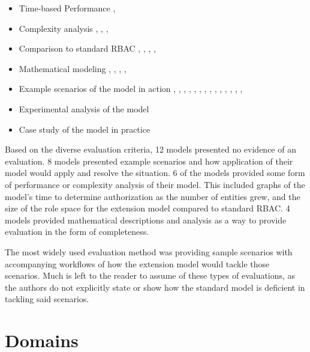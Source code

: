 \begin{itemize}
\setlength{\itemsep}{0.25pt}
\item Time-based Performance \cite{ni2010privacy}, \cite{aich09:role}
\item Complexity analysis \cite{bao08:role}, \cite{zhang06:collaborative}, \cite{chen08:spatio-temporal}, \cite{aich09:role}
\item Comparison to standard RBAC \cite{bao08:role}, \cite{zou2009crbac}, \cite{zhang06:collaborative}, \cite{zhao2008flexible}, \cite{ray07:spatio}
\item Mathematical modeling \cite{damian2007geo}, \cite{hansen2003spatial}, \cite{aich07:STARBAC}, \cite{chen08:spatio-temporal}, \cite{joshi05:generalized}
\item Example scenarios of the model in action \cite{alam06:constraint}, \cite{tzelepi01:flexible}, \cite{cholewka00:acontext-sensitive}, \cite{huang06:pervasive}, \cite{bao08:role}, \cite{jian2008extended}, \cite{yamazaki104:designing}, \cite{zou2009crbac}, \cite{ray07:spatio}, \cite{samuel07:spatio-temporal}, \cite{ray07:spatio}, \cite{joshi05:generalized}, \cite{yao2008task}, \cite{zhou2007team}, \cite{oh2003task}
\item Experimental analysis of the model
\item Case study of the model in practice \cite{motta03:contextual}
\end{itemize}

Based on the diverse evaluation criteria, 12 models presented no evidence of an evaluation.  8 models presented example scenarios
and how application of their model would apply and resolve the situation.  6 of the models provided some form of performance
or complexity analysis of their model.  This included graphs of the model's time to determine authorization as the number of entities
grew, and the size of the role space for the extension model compared to standard RBAC. 4 models provided mathematical descriptions
and analysis as a way to provide evaluation in the form of completeness.

The most widely used evaluation method was providing sample scenarios with accompanying workflows of how the extension model
would tackle those scenarios.  Much is left to the reader to assume of these types of evaluations, as the authors do not explicitly state
or show how the standard model is deficient in tackling said scenarios.


\section{Domains} \label{sec:domains}

